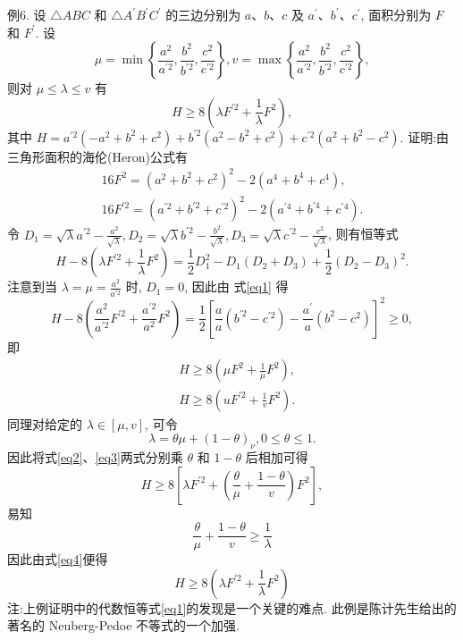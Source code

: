 例6. 设 $\triangle A B C$ 和 $\triangle A^{\prime} B^{\prime} C^{\prime}$ 的三边分别为 $a 、 b 、 c$ 及 $a^{\prime} 、 b^{\prime} 、 c^{\prime}$, 面积分别为 $F$ 和 $F^{\prime}$. 设
$$
\mu=\min \left\{\frac{a^2}{a^{\prime 2}}, \frac{b^2}{b^{\prime 2}}, \frac{c^2}{c^{\prime 2}}\right\}, v=\max \left\{\frac{a^2}{a^{\prime 2}}, \frac{b^2}{b^{\prime 2}}, \frac{c^2}{c^{\prime 2}}\right\},
$$
则对 $\mu \leqslant \lambda \leqslant v$ 有
$$
H \geqslant 8\left(\lambda F^{\prime 2}+\frac{1}{\lambda} F^2\right),
$$
其中 $H=a^{\prime 2}\left(-a^2+b^2+c^2\right)+b^{\prime 2}\left(a^2-b^2+c^2\right)+c^{\prime 2}\left(a^2+b^2-c^2\right)$.
证明:由三角形面积的海伦(Heron)公式有
$$
\begin{gathered}
16 F^2=\left(a^2+b^2+c^2\right)^2-2\left(a^4+b^4+c^4\right), \\
16 F^{\prime 2}=\left(a^{\prime 2}+b^{\prime 2}+c^{\prime 2}\right)^2-2\left(a^{\prime 4}+b^{\prime 4}+c^{\prime 4}\right) .
\end{gathered}
$$
令 $D_1=\sqrt{\lambda} a^{\prime 2}-\frac{a^2}{\sqrt{\lambda}}, D_2=\sqrt{\lambda} b^{\prime 2}-\frac{b^2}{\sqrt{\lambda}}, D_3=\sqrt{\lambda} c^{\prime 2}-\frac{c^2}{\sqrt{\lambda}}$, 则有恒等式
$$
H-8\left(\lambda F^{\prime 2}+\frac{1}{\lambda} F^2\right)=\frac{1}{2} D_1^2-D_1\left(D_2+D_3\right)+\frac{1}{2}\left(D_2-D_3\right)^2 . \label{eq1}
$$
注意到当 $\lambda=\mu=\frac{a^2}{a^{\prime 2}}$ 时, $D_1=0$, 因此由 式\ref{eq1} 得
$$
H-8\left(\frac{a^2}{a^{\prime 2}} F^{\prime 2}+\frac{a^{\prime 2}}{a^2} F^2\right)=\frac{1}{2}\left[\frac{a}{a}\left(b^{\prime 2}-c^{\prime 2}\right)-\frac{a^{\prime}}{a}\left(b^2-c^2\right)\right]^2 \geqslant 0,
$$
即
$$
\begin{aligned}
& H \geqslant 8\left(\mu F^2+\frac{1}{\mu} F^2\right), \label{eq2}\\
& H \geqslant 8\left(u F^{\prime 2}+\frac{1}{v} F^2\right) . \label{eq3}
\end{aligned}
$$
同理对给定的 $\lambda \in[\mu, v]$, 可令
$$
\lambda=\theta \mu+(1-\theta)_\nu, 0 \leqslant \theta \leqslant 1 .
$$
因此将式\ref{eq2}、\ref{eq3}两式分别乘 $\theta$ 和 $1-\theta$ 后相加可得
$$
H \geqslant 8\left[\lambda F^{\prime 2}+\left(\frac{\theta}{\mu}+\frac{1-\theta}{v}\right) F^2\right], \label{eq4}
$$
易知
$$
\frac{\theta}{\mu}+\frac{1-\theta}{v} \geqslant \frac{1}{\lambda}
$$
因此由式\ref{eq4}便得
$$
H \geqslant 8\left(\lambda F^{\prime 2}+\frac{1}{\lambda} F^2\right)
$$
注:上例证明中的代数恒等式\ref{eq1}的发现是一个关键的难点.
此例是陈计先生给出的著名的 Neuberg-Pedoe 不等式的一个加强.


